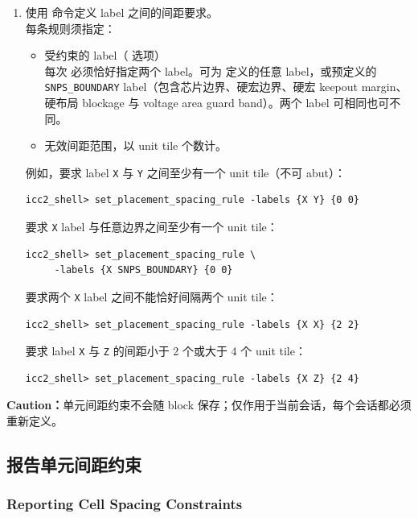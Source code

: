 \begin{enumerate}
  \item 使用  命令定义 label 之间的间距要求。\\
        每条规则须指定：
        \begin{itemize}
          \item 受约束的 label（ 选项）\\
                每次  必须恰好指定两个 label。可为  定义的任意 label，或预定义的 \texttt{SNPS\_BOUNDARY} label（包含芯片边界、硬宏边界、硬宏 keepout margin、硬布局 blockage 与 voltage area guard band）。两个 label 可相同也可不同。
          \item 无效间距范围，以 unit tile 个数计。
        \end{itemize}
        例如，要求 label \texttt{X} 与 \texttt{Y} 之间至少有一个 unit tile（不可 abut）：
\begin{lstlisting}
icc2_shell> set_placement_spacing_rule -labels {X Y} {0 0}
\end{lstlisting}
        要求 \texttt{X} label 与任意边界之间至少有一个 unit tile：
\begin{lstlisting}
icc2_shell> set_placement_spacing_rule \
     -labels {X SNPS_BOUNDARY} {0 0}
\end{lstlisting}
        要求两个 \texttt{X} label 之间不能恰好间隔两个 unit tile：
\begin{lstlisting}
icc2_shell> set_placement_spacing_rule -labels {X X} {2 2}
\end{lstlisting}
        要求 label \texttt{X} 与 \texttt{Z} 的间距小于 2 个或大于 4 个 unit tile：
\begin{lstlisting}
icc2_shell> set_placement_spacing_rule -labels {X Z} {2 4}
\end{lstlisting}
\end{enumerate}

\begin{noteBox}
\textbf{Caution：}单元间距约束不会随 block 保存；仅作用于当前会话，每个会话都必须重新定义。
\end{noteBox}

\subsection{报告单元间距约束}
\subsubsection*{Reporting Cell Spacing Constraints}

